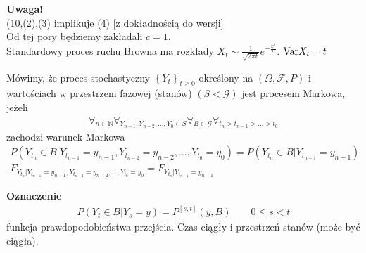 \textbf{Uwaga!}\\
(10,(2),(3) implikuje (4) [z dokładnością do wersji]\\
Od tej pory będziemy zakładali $ c=1 $.\\
Standardowy proces ruchu Browna ma rozkłady $ X_t\sim \frac{1}{\sqrt{2\pi t}}e^{-\frac{x^2}{2t}} $. $ \text{Var} X_t=t $
\begin{defi}
Mówimy, że proces stochastyczny $ \left\{Y_t\right\} _{t\ge 0}$ określony na $ (\Omega,\mathcal F,P) $ i wartościach w przestrzeni fazowej (stanów) $ (S<\mathcal G) $ jest procesem Markowa, jeżeli
\begin{gather*}
\forall_{n\in \mathbb N }\forall_{Y_{n-1},Y_{n-2},\dots,Y_0\in S}\forall_{B\in\mathcal G}\forall_{t_n>t_{n-1}>\dots>t_0}
\end{gather*}
zachodzi warunek Markowa
\begin{gather*}
P\left(Y_{t_n}\in B|
Y_{t_{n-1}}=y_{n-1},
Y_{t_{n-2}}=y_{n-2},
\dots,
Y_{t_{0}}=y_{0}
\right)=
P\left(Y_{t_n}\in B|
Y_{t_{n-1}}=y_{n-1}
\right)\\
F_{Y_{t_n}|
Y_{t_{n-1}}=y_{n-1},
Y_{t_{n-2}}=y_{n-2},
\dots,
Y_{t_{0}}=y_{0}}=
F_{Y_{t_n}|
Y_{t_{n-1}}=y_{n-1}}
\end{gather*}
\end{defi}
\textbf{Oznaczenie}
\begin{gather*}
P\left(Y_t\in B|Y_s=y\right)=P^{[s,t]}(y,B)\qquad 0\le s<t
\end{gather*}
funkcja prawdopodobieństwa przejścia. Czas ciągły i przestrzeń stanów (może być ciągła).

